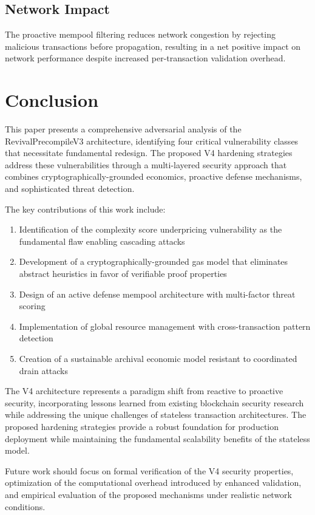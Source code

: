 \documentclass{article}
\begin{document}
\subsection{Network Impact}

The proactive mempool filtering reduces network congestion by rejecting malicious transactions before propagation, resulting in a net positive impact on network performance despite increased per-transaction validation overhead.

\section{Conclusion}

This paper presents a comprehensive adversarial analysis of the RevivalPrecompileV3 architecture, identifying four critical vulnerability classes that necessitate fundamental redesign. The proposed V4 hardening strategies address these vulnerabilities through a multi-layered security approach that combines cryptographically-grounded economics, proactive defense mechanisms, and sophisticated threat detection.

The key contributions of this work include:

\begin{enumerate}
\item Identification of the complexity score underpricing vulnerability as the fundamental flaw enabling cascading attacks
\item Development of a cryptographically-grounded gas model that eliminates abstract heuristics in favor of verifiable proof properties
\item Design of an active defense mempool architecture with multi-factor threat scoring
\item Implementation of global resource management with cross-transaction pattern detection
\item Creation of a sustainable archival economic model resistant to coordinated drain attacks
\end{enumerate}

The V4 architecture represents a paradigm shift from reactive to proactive security, incorporating lessons learned from existing blockchain security research while addressing the unique challenges of stateless transaction architectures. The proposed hardening strategies provide a robust foundation for production deployment while maintaining the fundamental scalability benefits of the stateless model.

Future work should focus on formal verification of the V4 security properties, optimization of the computational overhead introduced by enhanced validation, and empirical evaluation of the proposed mechanisms under realistic network conditions.




\end{document}
